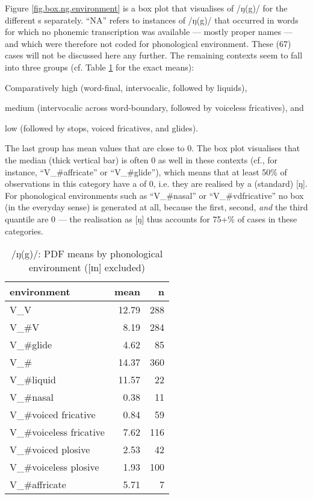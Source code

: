 Figure \ref{fig.box.ng.environment} is a box plot that visualises  of /ŋ(g)/ for the different s separately.
``NA'' refers to instances of /ŋ(g)/ that occurred in words for which no phonemic transcription was available --- mostly proper names --- and which were therefore not coded for phonological environment.
These (67) cases will not be discussed here any further.
The remaining contexts seem to fall into three groups (cf. Table \ref{tab.ng.mean.environment} for the exact means):
\begin{inparaenum}[(1)]
	\item Comparatively high  (word-final, intervocalic, followed by liquids),
	\item medium  (intervocalic across word-boundary, followed by voiceless fricatives), and
	\item low  (followed by stops, voiced fricatives, and glides).
\end{inparaenum}
The last group has mean  values that are close to 0.
The box plot visualises that the median (thick vertical bar) is often 0 as well in these contexts (cf., for instance, ``V\_\#affricate'' or ``V\_\#glide''), which means that at least 50\% of observations in this category have a  of 0, i.e. they are realised by a (standard) [ŋ].
For phonological environments such as ``V\_\#nasal'' or ``V\_\#vdfricative'' no box (in the everyday sense) is generated at all, because the first, second, \emph{and} the third quantile are 0 --- the realisation as [ŋ] thus accounts for 75+\% of cases in these categories.

\begin{table}[h]
	\centering
	\caption{/ŋ(g)/: PDF means by phonological environment ([ɪn] excluded)}
	\label{tab.ng.mean.environment}
	\begin{tabular}{lrr}
		\hline
		environment & mean \isi{PDF} & n\\
		\hline
		V\_V & 12.79 & 288\\
		V\_\#V & 8.19 & 284\\
		V\_\#glide & 4.62 & 85\\
		V\_\# & 14.37 & 360\\
		V\_\#liquid & 11.57 & 22\\
		V\_\#nasal & 0.38 & 11\\
		V\_\#voiced fricative & 0.84 & 59\\
		V\_\#voiceless fricative & 7.62 & 116\\
		V\_\#voiced plosive & 2.53 & 42\\
		V\_\#voiceless plosive & 1.93 & 100\\
		V\_\#affricate & 5.71 & 7\\
		\hline
	\end{tabular}
\end{table}

